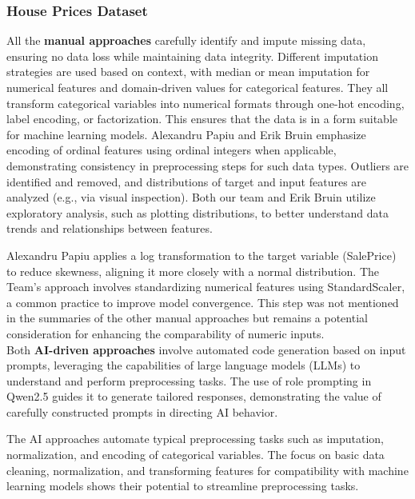 
\subsubsection{House Prices Dataset}

All the \textbf{manual approaches} carefully identify and impute missing data,
ensuring no data loss while maintaining data integrity. Different imputation
strategies are used based on context, with median or mean imputation for
numerical features and domain-driven values for categorical features. They all
transform categorical variables into numerical formats through one-hot
encoding, label encoding, or factorization. This ensures that the data is in a
form suitable for machine learning models. Alexandru Papiu and Erik Bruin
emphasize encoding of ordinal features using ordinal integers when applicable,
demonstrating consistency in preprocessing steps for such data types. Outliers
are identified and removed, and distributions of target and input features are
analyzed (e.g., via visual inspection). Both our team and Erik Bruin utilize
exploratory analysis, such as plotting distributions, to better understand data
trends and relationships between features.

Alexandru Papiu applies a log transformation to the target variable (SalePrice)
to reduce skewness, aligning it more closely with a normal distribution. The
Team's approach involves standardizing numerical features using StandardScaler,
a common practice to improve model convergence. This step was not mentioned in
the summaries of the other manual approaches but remains a potential
consideration for enhancing the comparability of numeric inputs.\\

Both \textbf{AI-driven approaches} involve automated code generation based on
input prompts, leveraging the capabilities of large language models (LLMs) to
understand and perform preprocessing tasks. The use of role prompting in Qwen2.5
guides it to generate tailored responses, demonstrating the value of carefully
constructed prompts in directing AI behavior.

The AI approaches automate typical preprocessing tasks such as imputation,
normalization, and encoding of categorical variables. The focus on basic data
cleaning, normalization, and transforming features for compatibility with
machine learning models shows their potential to streamline preprocessing
tasks.\\

